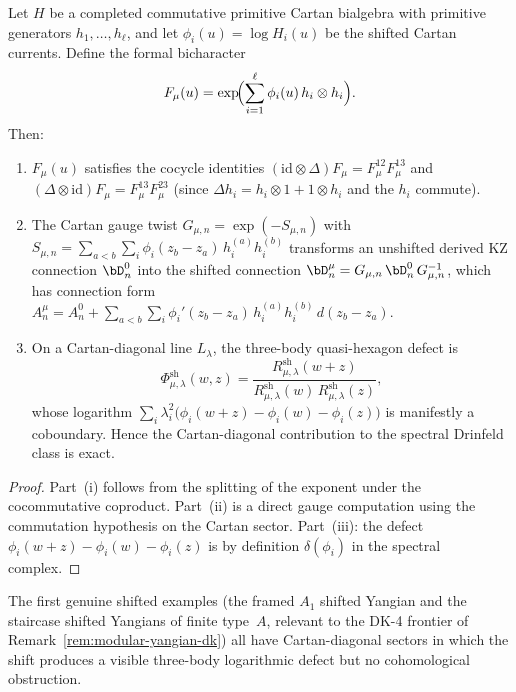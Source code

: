 \begin{theorem}
\label{thm:spectral-cartan-diagonal-exact}
Let $H$ be a completed commutative primitive Cartan bialgebra
with primitive generators $h_1, \ldots, h_\ell$, and let
$\phi_i(u) = \log H_i(u)$ be the shifted Cartan currents.
Define the formal bicharacter
\[
 F_\mu(u)
 = \exp\!\Bigl(\sum_{i=1}^\ell \phi_i(u)\,h_i \otimes h_i\Bigr).
\]
Then:
\begin{enumerate}[label=\textup{(\roman*)}]
\item $F_\mu(u)$ satisfies the cocycle identities
 $(\mathrm{id} \otimes \Delta)F_\mu = F_\mu^{12} F_\mu^{13}$
 and
 $(\Delta \otimes \mathrm{id})F_\mu = F_\mu^{13} F_\mu^{23}$
 \textup{(}since $\Delta h_i = h_i \otimes 1 + 1 \otimes h_i$
 and the $h_i$ commute\textup{)}.
\item The Cartan gauge twist
 $G_{\mu,n} = \exp(-S_{\mu,n})$ with
 $S_{\mu,n} = \sum_{a<b} \sum_i \phi_i(z_b - z_a)\,
 h_i^{(a)} h_i^{(b)}$
 transforms an unshifted derived KZ connection $\bD_n^0$
 into the shifted connection
 $\bD_n^\mu = G_{\mu,n}\,\bD_n^0\,G_{\mu,n}^{-1}$,
 which has connection form
 $A_n^\mu = A_n^0 + \sum_{a<b} \sum_i
 \phi_i'(z_b-z_a)\,h_i^{(a)}h_i^{(b)}\,d(z_b-z_a)$.
\item On a Cartan-diagonal line $L_\lambda$, the three-body
 quasi-hexagon defect is
 \[
 \Phi_{\mu,\lambda}^{\mathrm{sh}}(w,z)
 =
 \frac{R_{\mu,\lambda}^{\mathrm{sh}}(w+z)}
 {R_{\mu,\lambda}^{\mathrm{sh}}(w)\,
 R_{\mu,\lambda}^{\mathrm{sh}}(z)},
 \]
 whose logarithm
 $\sum_i \lambda_i^2\bigl(\phi_i(w+z) - \phi_i(w) - \phi_i(z)
 \bigr)$
 is manifestly a coboundary. Hence the Cartan-diagonal
 contribution to the spectral Drinfeld class is exact.
\end{enumerate}
\end{theorem}

\begin{proof}
Part~(i) follows from the splitting of the exponent under
the cocommutative coproduct. Part~(ii) is a direct gauge
computation using the commutation hypothesis on the Cartan
sector. Part~(iii): the defect $\phi_i(w+z) - \phi_i(w)
- \phi_i(z)$ is by definition $\delta(\phi_i)$ in the
spectral complex.
\end{proof}

The first genuine shifted examples (the framed $A_1$ shifted
Yangian and the staircase shifted Yangians of finite type~$A$,
relevant to the DK-4 frontier of
Remark~\ref{rem:modular-yangian-dk}) all have
Cartan-diagonal sectors in which the shift produces a visible
three-body logarithmic defect but no cohomological obstruction.

